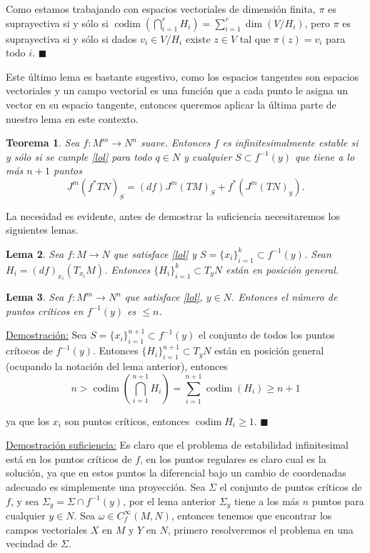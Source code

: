 \documentclass{report}
\newtheorem{theorem}{Teorema}[section]
\newtheorem{lem}[theorem]{Lema}
\theoremstyle{definition}
\DeclareMathOperator{\cod}{codim}
\begin{document}
Como estamos trabajando con espacios vectoriales de dimensi\'on finita, $\pi$ es suprayectiva si y s\'olo si $\cod (\bigcap\limits_{i=1}^r H_i ) = \sum\limits_{i=1}^r \dim (V /H_i)$, pero $\pi $ es suprayectiva si y s\'olo si dados $v_i \in V/H_i$ existe $z \in V$ tal que $\pi (z) = v_i$ para todo $i$. $\blacksquare$

Este \'ultimo lema es bastante sugestivo, como los espacios tangentes son espacios vectoriales y un campo vectorial es una funci\'on que a cada punto le asigna un vector en su espacio tangente, entonces queremos aplicar la \'ultima parte de nuestro lema en este contexto. 

\begin{theorem}
Sea $f: M^m \to N^n$ suave. Entonces $f$ es infinitesimalmente estable si y s\'olo si se cumple \ref{lol} para todo $q \in N$ y cualquier $S \subset f^{-1} (y)$ que tiene a lo m\'as $n+1$ puntos \begin{equation}J^m(f^\ast TN)_S = (df) J^m (TM)_S + f^\ast (J^m(TN)_y) .\tag{\#}\label{lol} \end{equation}
\end{theorem}

La necesidad es evidente, antes de demostrar la suficiencia necesitaremos los siguientes lemas.

\begin{lem}
Sea $f: M \to N$ que satisface \ref{lol} y $S = \{ x_i \}_{i=1}^k \subset f^{-1} (y)$. Sean $H_i = (df)_{x_i} (T_{x_i} M)$. Entonces $\{H_i \}_{i=1}^k \subset T_y N$ est\'an en posici\'on general.
\end{lem}

\begin{lem}
Sea $f:M ^m\to N^n$ que satisface \ref{lol}, $y \in N$. Entonces el n\'umero de puntos cr\'iticos en $f^{-1} (y)$ es $\leq n$.
\end{lem}

\underline{Demostraci\'on:} Sea $S= \{ x_i \}_{i=1}^{n+1} \subset f^{-1} (y)$ el conjunto de todos los puntos cr\'itocos de $f^{-1}(y)$. Entonces $\{ H_i \}_{i=1}^{n+1} \subset T_y N$ est\'an en posici\'on general (ocupando la notaci\'on del lema anterior), entonces $$n  > \cod (\bigcap\limits_{i=1}^{n+1} H_i ) = \sum\limits_{i=1}^{n+1} \cod ( H_i) \geq n+1$$

ya que los $x_i$ son puntos cr\'iticos, entonces $\cod H_i \geq 1$. $\blacksquare$

\underline{Demostraci\'on suficiencia:} Es claro que el problema de estabilidad infinitesimal est\'a en los puntos cr\'iticos de $f$, en los puntos regulares es claro cual es la soluci\'on, ya que en estos puntos la diferencial bajo un cambio de coordenadas adecuado es simplemente una proyecci\'on. Sea $\Sigma$ el conjunto de puntos cr\'iticos de $f$, y sea $\Sigma_y = \Sigma \cap f^{-1} (y)$, por el lema anterior $\Sigma_y$ tiene a los m\'as $n$ puntos para cualquier $y \in N$. Sea $\omega \in C^\infty_f (M,N)$, entonces tenemos que encontrar los campos vectoriales $X$ en $M$ y $Y$ en $N$, primero resolveremos el problema en una vecindad de $\Sigma$.
\end{document}
